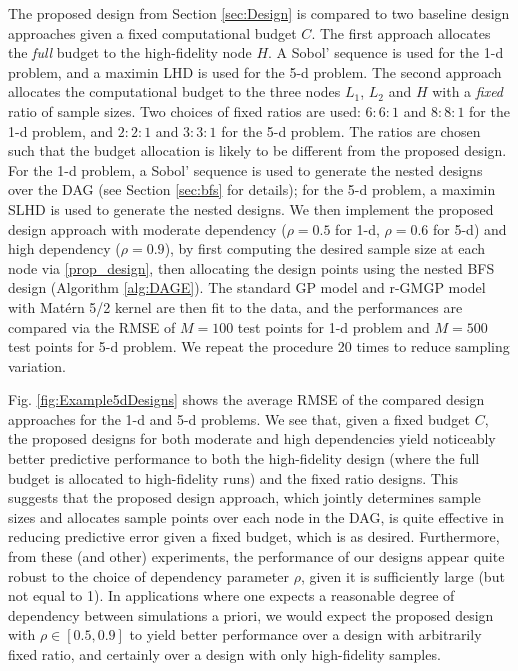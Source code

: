 \documentclass[12pt]{article}
\begin{document}
The proposed design from Section \ref{sec:Design} is compared to two baseline design approaches given a fixed computational budget $C$. The first approach allocates the \textit{full} budget to the high-fidelity node $H$. A Sobol' sequence \citep{joe2003remark} is used for the 1-d problem, and a maximin LHD \citep{morris1995exploratory} is used for the 5-d problem. The second approach allocates the computational budget to the three nodes $L_1$, $L_2$ and $H$ with a \textit{fixed} ratio of sample sizes. Two choices of fixed ratios are used: $6:6:1$ and $8:8:1$ for the 1-d problem, and $2:2:1$ and $3:3:1$ for the 5-d problem. The ratios are chosen such that the budget allocation is likely to be different from the proposed design. For the 1-d problem, a Sobol' sequence is used to generate the nested designs over the DAG (see Section \ref{sec:bfs} for details); for the 5-d problem, a maximin SLHD \citep{Ba2015SLHD} is used to generate the nested designs. We then implement the proposed design approach with moderate dependency ($\rho=0.5$ for 1-d, $\rho=0.6$ for 5-d) and high dependency ($\rho=0.9$), by first computing the desired sample size at each node via \eqref{prop_design}, then allocating the design points using the nested BFS design (Algorithm \ref{alg:DAGE}). The standard GP model and r-GMGP model with Mat\'ern 5/2 kernel are then fit to the data, and the performances are compared via the RMSE of $M=100$ test points for 1-d problem and $M=500$ test points for 5-d problem. We repeat the procedure 20 times to reduce sampling variation.

Fig. \ref{fig:Example5dDesigns} shows the average RMSE of the compared design approaches for the 1-d and 5-d problems. We see that, given a fixed budget $C$, the proposed designs for both moderate and high dependencies yield noticeably better predictive performance to both the high-fidelity design (where the full budget is allocated to high-fidelity runs) and the fixed ratio designs. This suggests that the proposed design approach, which jointly determines sample sizes and allocates sample points over each node in the DAG, is quite effective in reducing predictive error given a fixed budget, which is as desired. Furthermore, from these (and other) experiments, the performance of our designs appear quite robust to the choice of dependency parameter $\rho$, given it is sufficiently large (but not equal to 1). In applications where one expects a reasonable degree of dependency between simulations a priori, we would expect the proposed design with $\rho \in [0.5,0.9]$ to yield better performance over a design with arbitrarily fixed ratio, and certainly over a design with only high-fidelity samples.
\end{document}
